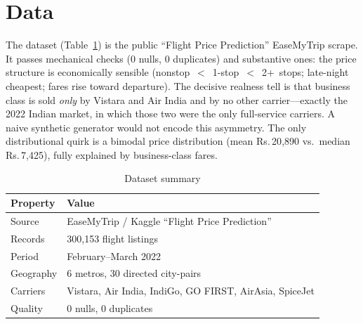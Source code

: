\documentclass[conference]{IEEEtran}
\newcommand{\INR}{\mbox{Rs.}}
\begin{document}
\section{Data}
The dataset (Table~\ref{tab:data}) is the public ``Flight Price Prediction'' EaseMyTrip scrape. It passes mechanical checks (0 nulls, 0 duplicates) and substantive ones: the price structure is economically sensible (nonstop~$<$~1-stop~$<$~2+~stops; late-night cheapest; fares rise toward departure). The decisive realness tell is that business class is sold \emph{only} by Vistara and Air India and by no other carrier---exactly the 2022 Indian market, in which those two were the only full-service carriers. A naive synthetic generator would not encode this asymmetry. The only distributional quirk is a bimodal price distribution (mean \INR{}\,20{,}890 vs.\ median \INR{}\,7{,}425), fully explained by business-class fares.

\begin{table}[!t]
\caption{Dataset summary}
\label{tab:data}
\centering
\renewcommand{\arraystretch}{1.15}
\begin{tabular}{@{}ll@{}}
\toprule
\textbf{Property} & \textbf{Value}\\
\midrule
Source & EaseMyTrip / Kaggle ``Flight Price Prediction''\\
Records & 300{,}153 flight listings\\
Period & February--March 2022\\
Geography & 6 metros, 30 directed city-pairs\\
Carriers & Vistara, Air India, IndiGo, GO FIRST, AirAsia, SpiceJet\\
Quality & 0 nulls, 0 duplicates\\
\bottomrule
\end{tabular}
\end{table}

\end{document}
